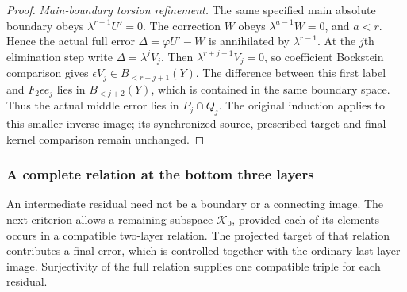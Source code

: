 \begin{proof}
\textit{Main-boundary torsion refinement.}
The same specified main absolute boundary obeys
$\lambda^{r-1}U'=0$. The correction $W$ obeys
$\lambda^{a-1}W=0$, and $a<r$. Hence the actual full error
$\Delta=\varphi U'-W$ is annihilated by $\lambda^{r-1}$.
At the $j$th elimination step write $\Delta=\lambda^jV_j$.
Then $\lambda^{r+j-1}V_j=0$, so coefficient Bockstein comparison
gives $\epsilon V_j\in B_{<r+j+1}(Y)$.
The difference between this first label and $F_2\epsilon e_j$
lies in $B_{<j+2}(Y)$, which is contained in the same boundary
space. Thus the actual middle error lies in $P_j\cap Q_j$.
The original induction applies to this smaller inverse image;
its synchronized source, prescribed target and final kernel
comparison remain unchanged.
\end{proof}


\subsubsection{A complete relation at the bottom three layers}

An intermediate residual need not be a boundary or a connecting image.
The next criterion allows a remaining subspace $\mathcal K_0$, provided
each of its elements occurs in a compatible two-layer relation.
The projected target of that relation contributes a final error, which
is controlled together with the ordinary last-layer image. Surjectivity
of the full relation supplies one compatible triple for each residual.

